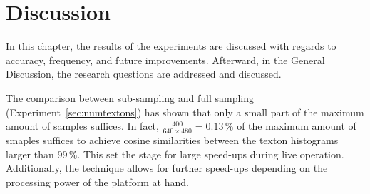 \chapter{Discussion}
\label{chap:discussion}

In this chapter, the results of the experiments are discussed with regards to accuracy, frequency, and future improvements. Afterward, in the General Discussion, the research questions are addressed and discussed.

The comparison between sub-sampling and full sampling (Experiment~\ref{sec:numtextons}) has shown that only a small part of the maximum amount of
samples suffices. In fact, $\frac{400}{640 \times 480} = 0.13\,\%$ of the maximum amount of smaples suffices to achieve cosine similarities between the texton histograms larger than $99\,\%$. This set the stage for
large speed-ups during live operation. Additionally, the technique allows for further speed-ups depending on the processing power of the platform at hand.
